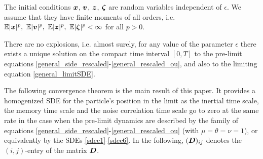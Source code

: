 \begin{ass} \label{ass2} The initial conditions $\boldsymbol{x}$, $\boldsymbol{v}$, $\boldsymbol{z}$, $\boldsymbol{\zeta}$ are random variables  independent of $\epsilon$.   We assume that they have finite moments of all orders, i.e. $\mathbb{E}|\vecc{x}|^{p}, \ \mathbb{E}|\vecc{v}|^{p}, \  \mathbb{E}|\vecc{z}|^p, \ \mathbb{E}|\vecc{\zeta}|^p < \infty$ for all $p>0$. 
\end{ass}



\begin{ass} \label{ass4} There are no explosions, i.e. almost surely, for any value of the parameter $\epsilon$ there exists a unique solution on the compact time interval $[0,T]$  to the pre-limit equations \eqref{general_side_rescaled}-\eqref{general_rescaled_ou}, and also to the limiting equation \eqref{general_limitSDE}. 
\end{ass}

    

The following convergence theorem is the main result of this paper. It provides a homogenized SDE for the particle's position in the limit as the inertial time scale, the memory time scale and the noise correlation time scale go to zero at the same rate in the case when the pre-limit dynamics are described by the family of equations \eqref{general_side_rescaled}-\eqref{general_rescaled_ou} (with $\mu = \theta = \nu = 1$), or equivalently by the SDEs \eqref{sdec1}-\eqref{sdec6}.
In the following, $(\boldsymbol{D})_{ij}$ denotes the $(i,j)$-entry of the matrix $\boldsymbol{D}$.



